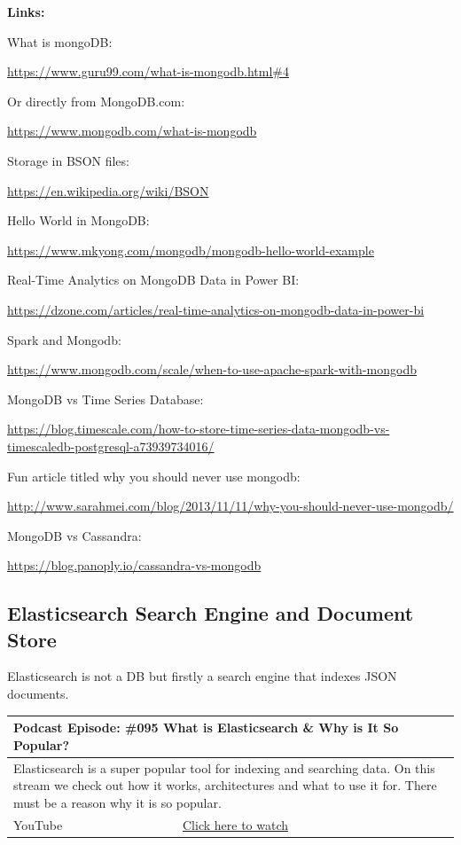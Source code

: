 \documentclass[12pt, numbers=noenddot]{scrreprt} %
\begin{document}
\textbf{Links:}

What is mongoDB:

\url{https://www.guru99.com/what-is-mongodb.html#4}

Or directly from MongoDB.com:

\url{https://www.mongodb.com/what-is-mongodb}
 
Storage in BSON files:

\url{https://en.wikipedia.org/wiki/BSON}

Hello World in MongoDB:

\url{https://www.mkyong.com/mongodb/mongodb-hello-world-example}

Real-Time Analytics on MongoDB Data in Power BI:

\url{https://dzone.com/articles/real-time-analytics-on-mongodb-data-in-power-bi}
  
Spark and Mongodb:

\url{https://www.mongodb.com/scale/when-to-use-apache-spark-with-mongodb}
 
MongoDB vs Time Series Database:

\url{https://blog.timescale.com/how-to-store-time-series-data-mongodb-vs-timescaledb-postgresql-a73939734016/}
 
Fun article titled why you should never use mongodb:

\url{http://www.sarahmei.com/blog/2013/11/11/why-you-should-never-use-mongodb/}
 
MongoDB vs Cassandra:

\url{https://blog.panoply.io/cassandra-vs-mongodb}

\subsection{Elasticsearch Search Engine and Document Store}

Elasticsearch is not a DB but firstly a search engine that indexes JSON documents.

\begin{table}[htbp]
\begin{tabular}{ll}
\hline
\multicolumn{2}{l}{\textbf{Podcast Episode:} \#095 What is Elasticsearch \& Why is It So Popular?} \\ \hline
\multicolumn{2}{p{15cm}}{Elasticsearch is a super popular tool for indexing and searching data. On this stream we check out how it works, architectures and what to use it for. There must be a reason why it is so popular.}         \\ \hline
\multicolumn{1}{l|}{YouTube}   & \href{https://youtu.be/hNb5zB4OPXM}{Click here to watch}   \\  \hline
\end{tabular}
\end{table}
\end{document}
